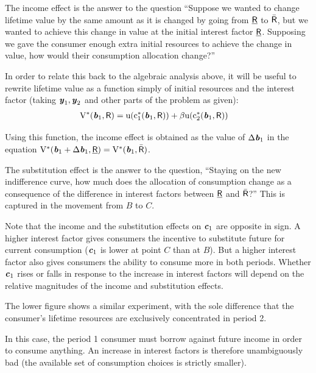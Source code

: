 \documentclass{scrartcl}
\begin{document}
  The income effect is the answer to the question ``Suppose we wanted to change lifetime value by the same amount as it is changed by going from $\underline{\mathsf{R}}$ to $\bar{\mathsf{R}}$, but we wanted to achieve this change in value at the initial interest factor $\underline{\mathsf{R}}$.  Supposing we gave the consumer enough extra initial resources to achieve the change in value, how would their consumption allocation change?''

  In order to relate this back to the algebraic analysis above, it will be useful to rewrite lifetime value as a function simply of initial resources and the interest factor (taking ${\boldsymbol{\mathit{y}}_{1},\boldsymbol{\mathit{y}}_{2}}$ and other parts of the problem as given):
  \begin{equation}\begin{gathered}\begin{aligned} \mathrm{V}^{*}(\boldsymbol{\mathit{b}}_{1},\mathsf{R}) & = \mathrm{u}(\mathrm{c}_{1}^{*}(\boldsymbol{\mathit{b}}_{1},\mathsf{R}))+\beta \mathrm{u}(\mathrm{c}_{2}^{*}(\boldsymbol{\mathit{b}}_{1},\mathsf{R}))
      \end{aligned}\end{gathered}\end{equation}

  Using this function, the income effect is obtained as the value of $\Delta \boldsymbol{\mathit{b}}_{1}$ in the equation $\mathrm{V}^{*}(\boldsymbol{\mathit{b}}_{1}+\Delta \boldsymbol{\mathit{b}}_{1},\underline{\mathsf{R}})=\mathrm{V}^{*}(\boldsymbol{\mathit{b}}_{1},\bar{\mathsf{R}})$.

  The substitution effect is the answer to the question, ``Staying on the new indifference curve, how much does the allocation of consumption change as a consequence of the difference in interest factors between $\underline{\mathsf{R}}$ and $\bar{\mathsf{R}}$?''  This is captured in the movement from $B$ to $C$.

  Note that the income and the substitution effects on $\boldsymbol{\mathit{c}}_{1}$ are opposite in sign.  A higher interest factor gives consumers the incentive to substitute future for current consumption ($\boldsymbol{\mathit{c}}_{1}$ is lower at point $C$ than at $B$).  But a higher interest factor also gives consumers the ability to consume more in both periods.  Whether $\boldsymbol{\mathit{c}}_{1}$ rises or falls in response to the increase in interest factors will depend on the relative magnitudes of the income and substitution effects.

  The lower figure shows a similar experiment, with the sole difference that the consumer's lifetime resources are exclusively concentrated in period 2.

  In this case, the period 1 consumer must borrow against future income in order to consume anything.  An increase in interest factors is therefore unambiguously bad (the available set of consumption choices is strictly smaller).
\end{document}
